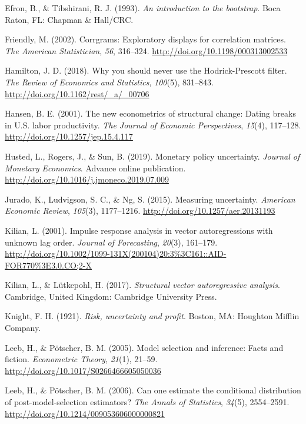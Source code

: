 \documentclass[12pt,twoside]{reedthesis}
\begin{document}
\leavevmode\hypertarget{ref-efrotibs:1993}{}%
Efron, B., \& Tibshirani, R. J. (1993). \emph{An introduction to the bootstrap}. Boca Raton, FL: Chapman \& Hall/CRC.

\leavevmode\hypertarget{ref-friendly:2002}{}%
Friendly, M. (2002). Corrgrams: Exploratory displays for correlation matrices. \emph{The American Statistician}, \emph{56}, 316--324. \url{http://doi.org/10.1198/000313002533}

\leavevmode\hypertarget{ref-hamilton:2018}{}%
Hamilton, J. D. (2018). Why you should never use the Hodrick-Prescott filter. \emph{The Review of Economics and Statistics}, \emph{100}(5), 831--843. \url{http://doi.org/10.1162/rest/_a/_00706}

\leavevmode\hypertarget{ref-hansen:2001}{}%
Hansen, B. E. (2001). The new econometrics of structural change: Dating breaks in U.S. labor productivity. \emph{The Journal of Economic Perspectives}, \emph{15}(4), 117--128. \url{http://doi.org/10.1257/jep.15.4.117}

\leavevmode\hypertarget{ref-hustetal:2019}{}%
Husted, L., Rogers, J., \& Sun, B. (2019). Monetary policy uncertainty. \emph{Journal of Monetary Economics}. Advance online publication. \url{http://doi.org/10.1016/j.jmoneco.2019.07.009}

\leavevmode\hypertarget{ref-juraetal:2015}{}%
Jurado, K., Ludvigson, S. C., \& Ng, S. (2015). Measuring uncertainty. \emph{American Economic Review}, \emph{105}(3), 1177--1216. \url{http://doi.org/10.1257/aer.20131193}

\leavevmode\hypertarget{ref-kilian:2001}{}%
Kilian, L. (2001). Impulse response analysis in vector autoregressions with unknown lag order. \emph{Journal of Forecasting}, \emph{20}(3), 161--179. \url{http://doi.org/10.1002/1099-131X(200104)20:3\%3C161::AID-FOR770\%3E3.0.CO;2-X}

\leavevmode\hypertarget{ref-kililutk:2017}{}%
Kilian, L., \& Lütkepohl, H. (2017). \emph{Structural vector autoregressive analysis}. Cambridge, United Kingdom: Cambridge University Press.

\leavevmode\hypertarget{ref-knight:1921}{}%
Knight, F. H. (1921). \emph{Risk, uncertainty and profit}. Boston, MA: Houghton Mifflin Company.

\leavevmode\hypertarget{ref-leebpots:2005}{}%
Leeb, H., \& Pötscher, B. M. (2005). Model selection and inference: Facts and fiction. \emph{Econometric Theory}, \emph{21}(1), 21--59. \url{http://doi.org/10.1017/S0266466605050036}

\leavevmode\hypertarget{ref-leebpots:2006}{}%
Leeb, H., \& Pötscher, B. M. (2006). Can one estimate the conditional distribution of post-model-selection estimators? \emph{The Annals of Statistics}, \emph{34}(5), 2554--2591. \url{http://doi.org/10.1214/009053606000000821}
\end{document}
